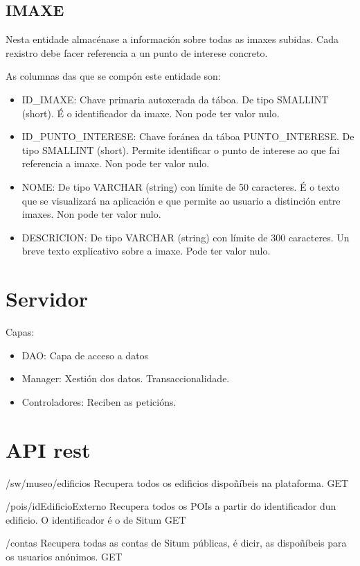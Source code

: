 \subsection{IMAXE}
Nesta entidade almacénase a información sobre todas as imaxes subidas. Cada rexistro debe facer referencia a un punto de interese concreto.

As columnas das que se compón este entidade son:
\begin{itemize}
	\item ID\_IMAXE: Chave primaria autoxerada da táboa. De tipo SMALLINT (short). É o identificador da imaxe. Non pode ter valor nulo.
	\item ID\_PUNTO\_INTERESE: Chave foránea da táboa PUNTO\_INTERESE. De tipo SMALLINT (short). Permite identificar o punto de interese ao que fai referencia a imaxe. Non pode ter valor nulo.
	\item NOME: De tipo VARCHAR (string) con límite de 50 caracteres. É o texto que se visualizará na aplicación e que permite ao usuario a distinción entre imaxes. Non pode ter valor nulo.
	\item DESCRICION: De tipo VARCHAR (string) con límite de 300 caracteres. Un breve texto explicativo sobre a imaxe. Pode ter valor nulo.
\end{itemize}

\section{Servidor}

Capas:
\begin{itemize}
	\item DAO: Capa de acceso a datos
	\item Manager: Xestión dos datos. Transaccionalidade.
	\item Controladores: Reciben as peticións.
\end{itemize}




\section{API rest}

/sw/museo/edificios
Recupera todos os edificios dispoñíbeis na plataforma.
GET


/pois/{idEdificioExterno}
Recupera todos os POIs a partir do identificador dun edificio. O identificador é o de Situm
GET


/contas
Recupera todas as contas de Situm públicas, é dicir, as dispoñíbeis para os usuarios anónimos.
GET


